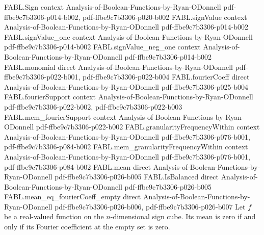 \begin{theorem}
\label{FABL.isBalanced_iff_fourierCoeff_empty_eq_zero}
\leanok
{}
\proofstep
  {FABL.Sign}
  {context}
  {Analysis-of-Boolean-Functions-by-Ryan-ODonnell}
  {pdf-ffbe9c7b3306-p014-b002,
    pdf-ffbe9c7b3306-p020-b002}
\proofstep
  {FABL.signValue}
  {context}
  {Analysis-of-Boolean-Functions-by-Ryan-ODonnell}
  {pdf-ffbe9c7b3306-p014-b002}
\proofstep
  {FABL.signValue_one}
  {context}
  {Analysis-of-Boolean-Functions-by-Ryan-ODonnell}
  {pdf-ffbe9c7b3306-p014-b002}
\proofstep
  {FABL.signValue_neg_one}
  {context}
  {Analysis-of-Boolean-Functions-by-Ryan-ODonnell}
  {pdf-ffbe9c7b3306-p014-b002}
\proofstep
  {FABL.monomial}
  {direct}
  {Analysis-of-Boolean-Functions-by-Ryan-ODonnell}
  {pdf-ffbe9c7b3306-p022-b001,
    pdf-ffbe9c7b3306-p022-b004}
\proofstep
  {FABL.fourierCoeff}
  {direct}
  {Analysis-of-Boolean-Functions-by-Ryan-ODonnell}
  {pdf-ffbe9c7b3306-p025-b004}
\proofstep
  {FABL.fourierSupport}
  {context}
  {Analysis-of-Boolean-Functions-by-Ryan-ODonnell}
  {pdf-ffbe9c7b3306-p022-b002,
    pdf-ffbe9c7b3306-p022-b003}
\proofstep
  {FABL.mem_fourierSupport}
  {context}
  {Analysis-of-Boolean-Functions-by-Ryan-ODonnell}
  {pdf-ffbe9c7b3306-p022-b002}
\proofstep
  {FABL.granularityFrequencyWithin}
  {context}
  {Analysis-of-Boolean-Functions-by-Ryan-ODonnell}
  {pdf-ffbe9c7b3306-p076-b001,
    pdf-ffbe9c7b3306-p084-b002}
\proofstep
  {FABL.mem_granularityFrequencyWithin}
  {context}
  {Analysis-of-Boolean-Functions-by-Ryan-ODonnell}
  {pdf-ffbe9c7b3306-p076-b001,
    pdf-ffbe9c7b3306-p084-b002}
\proofstep
  {FABL.mean}
  {direct}
  {Analysis-of-Boolean-Functions-by-Ryan-ODonnell}
  {pdf-ffbe9c7b3306-p026-b005}
\proofstep
  {FABL.IsBalanced}
  {direct}
  {Analysis-of-Boolean-Functions-by-Ryan-ODonnell}
  {pdf-ffbe9c7b3306-p026-b005}
\proofstep
  {FABL.mean_eq_fourierCoeff_empty}
  {direct}
  {Analysis-of-Boolean-Functions-by-Ryan-ODonnell}
  {pdf-ffbe9c7b3306-p026-b006,
    pdf-ffbe9c7b3306-p026-b007}
Let $f$ be a real-valued function on the $n$-dimensional sign cube. Its mean is zero if
and only if its Fourier coefficient at the empty set is zero.
\end{theorem}

